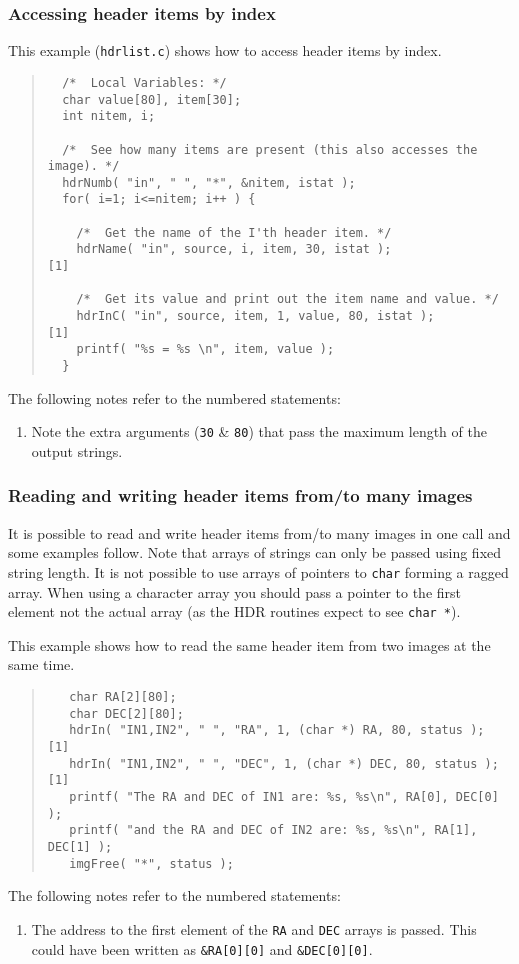 \documentclass[twoside,11pt]{article}
\newcommand{\htmladdnormallink}[2]{#1}
\renewcommand{\_}{\texttt{\symbol{95}}}
\newcommand{\myverb}[1]{{\texttt{#1}}}
\newcommand{\mynote}{The following notes refer to the numbered statements:}
\newenvironment{code}{\begin{small} \begin{quote}}
                     {\end{quote} \end{small}}
\newenvironment{enumnotes}
{
   \renewcommand{\labelenumi}{\myverb{[\theenumi]}}
   \begin{enumerate}
}{
   \end{enumerate}
   \renewcommand{\labelenumi}{\theenumi}
}
\renewenvironment{enumnotes}
  {
    \begin{enumerate}
  }{
    \end{enumerate}
  }
\begin{document}
\subsubsection{Accessing header items by index}
This example
(\htmladdnormallink{\myverb{hdrlist.c}}{../../bin/examples/img/hdrlist.c})
shows how to access header items by index.
\begin{code}
\begin{verbatim}
  /*  Local Variables: */
  char value[80], item[30];
  int nitem, i;

  /*  See how many items are present (this also accesses the image). */
  hdrNumb( "in", " ", "*", &nitem, istat );
  for( i=1; i<=nitem; i++ ) {

    /*  Get the name of the I'th header item. */
    hdrName( "in", source, i, item, 30, istat );                     [1]

    /*  Get its value and print out the item name and value. */
    hdrInC( "in", source, item, 1, value, 80, istat );               [1]
    printf( "%s = %s \n", item, value );
  }
\end{verbatim}
\end{code}
\mynote
\begin{enumnotes}
\item Note the extra arguments (\texttt{30} \& \texttt{80}) that pass the
      maximum length of the output strings.
\end{enumnotes}

\subsubsection{Reading and writing header items from/to many images}
It is possible to read and write header items from/to many images in
one call and some examples follow. Note that arrays of strings can
only be passed using fixed string length. It is not possible to use
arrays of pointers to \texttt{char} forming a ragged array. When
using a character array you should pass a pointer to the first element
not the actual array (as the HDR routines expect to see \texttt{char *}).

This example shows how to read the same header item from two images
at the same time.
\begin{code}
\begin{verbatim}
   char RA[2][80];
   char DEC[2][80];
   hdrIn( "IN1,IN2", " ", "RA", 1, (char *) RA, 80, status );         [1]
   hdrIn( "IN1,IN2", " ", "DEC", 1, (char *) DEC, 80, status );       [1]
   printf( "The RA and DEC of IN1 are: %s, %s\n", RA[0], DEC[0] );
   printf( "and the RA and DEC of IN2 are: %s, %s\n", RA[1], DEC[1] );
   imgFree( "*", status );
\end{verbatim}
\end{code}
\mynote
\begin{enumnotes}
\item The address to the first element of the \texttt{RA} and \texttt{DEC}
arrays is passed. This could have been written as 
\texttt{\&RA[0][0]} and \texttt{\&DEC[0][0]}.
\end{enumnotes}
\end{document}
